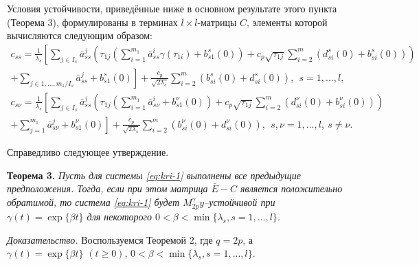  Условия устойчивости, приведённые ниже в основном результате этого
пункта (Теорема 3), формулированы в терминах $l\times l$-матрицы
$C$, элементы которой вычисляются следующим образом:
$$
\begin{array}{crl}
c_{ss} = \frac{1}{\lambda _s } \left [\sum \limits_{j \in I_s} \bar
a^{j}_{ss}\left (\tau _{1j}
 \left (\sum \limits_{i=1}^{m_1}\bar a^{i}_{ss} \gamma (\tau
 _{1i})
 + b^s_{s1}(0)\right ) +
c_p\sqrt{\tau _{1j}} \sum\limits_{i
=2}^{m}(d^s_{si}(0) + b^s_{si}(0))\right )\right .\\
\left . +\sum\limits_{j \in {1,...,m_1}/ I_s} \bar a^{j}_{ss} +
b^s_{s1}(0)\right ] + \frac{c_p}{\sqrt{2\lambda_s }}
\sum\limits_{i=2}^{m} (b^s_{si}(0) + d^s_{si} (0)), \ \  s =
1,...,l,
\end{array}
$$
$$
\begin{array}{crl}
c_{s\nu} = \frac{1}{\lambda _s } \left [\sum \limits_{j \in I_s}
\bar a^{j}_{ss}\left (\tau _{1j}
 \left (\sum \limits_{i=1}^{m_1}\bar a^{i}_{s\nu} + b^\nu_{s1}(0)\right ) +
c_p\sqrt{\tau _{1j}} \sum\limits_{i
=2}^{m}(d^\nu_{si}(0) + b^\nu_{si}(0))\right )\right .\\
\left . +\sum\limits_{j =1}^{m_1} \bar a^{j}_{s\nu} +
b^\nu_{s1}(0)\right ] + \frac{c_p}{\sqrt{2\lambda_s }}
\sum\limits_{i=2}^{m} (b^\nu_{si}(0) +d^\nu_{si} (0)), \ \ s,\nu =
1,...,l, \ s \neq \nu.
\end{array}
$$

Справедливо следующее утверждение.

\textbf {Теорема 3.} {\it Пусть для системы \eqref{eq:kri-1} выполнены все
предыдущие предположения. Тогда, если при этом матрица $\bar E - C$
является положительно обратимой, то система \eqref{eq:kri-1} будет $M_{2p}^\gamma
y$--устойчивой при $\gamma (t) = \exp \{\beta t\}$ для некоторого
$0<\beta < \min \{\lambda _s, s = 1, ..., l \}$.}

{\it Доказательство.}  Воспользуемся Теоремой 2, где $q = 2p$, а
$\gamma (t) = \exp \{\beta t\} \,\, (t \geq 0)$, $0< \beta < \min
\{\lambda _s, s = 1, ..., l \}$.

